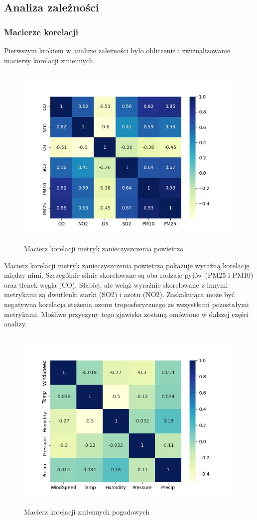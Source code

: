 \documentclass[18pt, letterpaper]{article}
\begin{document}
\subsection{Analiza zależności}
\subsubsection{Macierze korelacji}
Pierwszym krokiem w analizie zależności było obliczenie i zwizualizowanie macierzy korelacji zmiennych. 

\begin{figure}[H]
\centering
\includegraphics[width=120mm, height=90mm]{visualisations/corr_heatmaps/pollution_corr_heatmap.png}
\caption{Macierz korelacji metryk zanieczyszczenia powietrza}
\end{figure}

Macierz korelacji metryk zanieczyszczenia powietrza pokazuje wyraźną korelację między nimi. Szczególnie silnie skorelowane są oba rodzaje pyłów (PM25 i PM10) oraz tlenek węgla (CO). Słabiej, ale wciąż wyraźnie skorelowane z innymi metrykami są dwutlenki siarki (SO2) i azotu (NO2). Zaskakująca może być negatywna korelacja stężenia ozonu troposferycznego ze wszystkimi pozostałymi metrykami. Możliwe przyczyny tego zjawiska zostaną omówione w dalszej części analizy.

\begin{figure}[H]
\centering
\includegraphics[width=120mm, height=90mm]{visualisations/corr_heatmaps/weather_corr_rolling_heatmap.png}
\caption{Macierz korelacji zmiennych pogodowych}
\end{figure}
\end{document}
